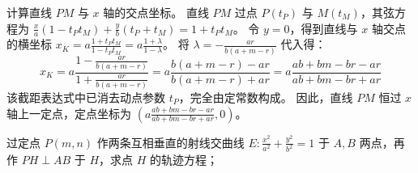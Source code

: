 \begin{solution}
计算直线 $PM$ 与 $x$ 轴的交点坐标。
直线 $PM$ 过点 $P(t_P)$ 与 $M(t_M)$，其弦方程为 $\frac{x}{a}(1 - t_P t_M) + \frac{y}{b}(t_P + t_M) = 1 + t_P t_M$。
令 $y = 0$，得到直线与 $x$ 轴交点的横坐标 $x_K = a \frac{1 + t_P t_M}{1 - t_P t_M} = a \frac{1 + \lambda}{1 - \lambda}$。
将 $\lambda = -\frac{ar}{b(a+m-r)}$ 代入得：
\[ x_K = a \frac{1 - \frac{ar}{b(a+m-r)}}{1 + \frac{ar}{b(a+m-r)}} = a \frac{b(a+m-r) - ar}{b(a+m-r) + ar} = a \frac{ab+bm-br-ar}{ab+bm-br+ar} \]
该截距表达式中已消去动点参数 $t_P$，完全由定常数构成。
因此，直线 $PM$ 恒过 $x$ 轴上一定点，定点坐标为 $\left( a \frac{ab+bm-br-ar}{ab+bm-br+ar}, 0 \right)$。
\end{solution}

\begin{exercise}
过定点 \(P(m,n)\) 作两条互相垂直的射线交曲线 \(E: \frac{x^2}{a^2} + \frac{y^2}{b^2} = 1\) 于 \(A,B\) 两点，再作 \(PH \perp AB\) 于 \(H\)，求点 \(H\) 的轨迹方程；
\end{exercise}
